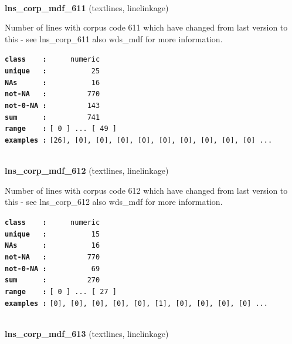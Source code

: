 \documentclass[]{article}
\begin{document}
~

\textbf{lns\_corp\_mdf\_611} (textlines, linelinkage)

Number of lines with corpus code 611 which have changed from last
version to this - see lns\_corp\_611 also wds\_mdf for more information.

\textbf{\texttt{class\ \ \ \ :}} \texttt{~~~~~numeric}\\
\textbf{\texttt{unique\ \ \ :}} \texttt{~~~~~~~~~~25}\\
\textbf{\texttt{NAs\ \ \ \ \ \ :}} \texttt{~~~~~~~~~~16}\\
\textbf{\texttt{not-NA\ \ \ :}} \texttt{~~~~~~~~~770}\\
\textbf{\texttt{not-0-NA\ :}} \texttt{~~~~~~~~~143}\\
\textbf{\texttt{sum\ \ \ \ \ \ :}} \texttt{~~~~~~~~~741}\\
\textbf{\texttt{range\ \ \ \ :}}
\texttt{{[}\ 0\ {]}\ ...\ {[}\ 49\ {]}}\\
\textbf{\texttt{examples\ :}}
\texttt{{[}26{]},\ {[}0{]},\ {[}0{]},\ {[}0{]},\ {[}0{]},\ {[}0{]},\ {[}0{]},\ {[}0{]},\ {[}0{]},\ {[}0{]}\ ...}\\

~

\textbf{lns\_corp\_mdf\_612} (textlines, linelinkage)

Number of lines with corpus code 612 which have changed from last
version to this - see lns\_corp\_612 also wds\_mdf for more information.

\textbf{\texttt{class\ \ \ \ :}} \texttt{~~~~~numeric}\\
\textbf{\texttt{unique\ \ \ :}} \texttt{~~~~~~~~~~15}\\
\textbf{\texttt{NAs\ \ \ \ \ \ :}} \texttt{~~~~~~~~~~16}\\
\textbf{\texttt{not-NA\ \ \ :}} \texttt{~~~~~~~~~770}\\
\textbf{\texttt{not-0-NA\ :}} \texttt{~~~~~~~~~~69}\\
\textbf{\texttt{sum\ \ \ \ \ \ :}} \texttt{~~~~~~~~~270}\\
\textbf{\texttt{range\ \ \ \ :}}
\texttt{{[}\ 0\ {]}\ ...\ {[}\ 27\ {]}}\\
\textbf{\texttt{examples\ :}}
\texttt{{[}0{]},\ {[}0{]},\ {[}0{]},\ {[}0{]},\ {[}0{]},\ {[}1{]},\ {[}0{]},\ {[}0{]},\ {[}0{]},\ {[}0{]}\ ...}\\

~

\textbf{lns\_corp\_mdf\_613} (textlines, linelinkage)
\end{document}
